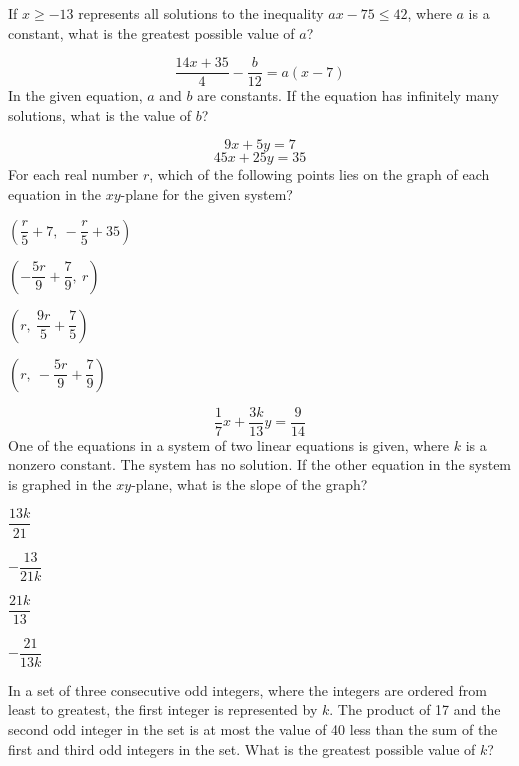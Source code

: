 \vfill
\noindent\begin{minipage}{\linewidth}
\par\smallskip
If $x\ge-13$ represents all solutions to the inequality $ax-75\le42$, where $a$ is a constant, what is the greatest possible value of $a$?
\end{minipage}
\vfill
\noindent\begin{minipage}{\linewidth}
\par\smallskip
$$\frac{14x+35}{4}-\frac{b}{12}=a(x-7)$$ In the given equation, $a$ and $b$ are constants. If the equation has infinitely many solutions, what is the value of $b$?
\end{minipage}
\vfill
\clearpage
\noindent\begin{minipage}{\linewidth}
\par\smallskip
$$9x+5y=7$$ $$45x+25y=35$$ For each real number $r$, which of the following points lies on the graph of each equation in the $xy$-plane for the given system?
\begin{satchoices}
  \item[A)] $\left(\dfrac{r}{5}+7,\ -\dfrac{r}{5}+35\right)$
  \item[B)] $\left(-\dfrac{5r}{9}+\dfrac{7}{9},\ r\right)$
  \item[C)] $\left(r,\ \dfrac{9r}{5}+\dfrac{7}{5}\right)$
  \item[D)] $\left(r,\ -\dfrac{5r}{9}+\dfrac{7}{9}\right)$
\end{satchoices}
\end{minipage}
\vfill
\noindent\begin{minipage}{\linewidth}
\par\smallskip
$$\frac{1}{7}x+\frac{3k}{13}y=\frac{9}{14}$$ One of the equations in a system of two linear equations is given, where $k$ is a nonzero constant. The system has no solution. If the other equation in the system is graphed in the $xy$-plane, what is the slope of the graph?
\begin{satchoices}
  \item[A)] $\dfrac{13k}{21}$
  \item[B)] $-\dfrac{13}{21k}$
  \item[C)] $\dfrac{21k}{13}$
  \item[D)] $-\dfrac{21}{13k}$
\end{satchoices}
\end{minipage}
\vfill
\noindent\begin{minipage}{\linewidth}
\par\smallskip
In a set of three consecutive odd integers, where the integers are ordered from least to greatest, the first integer is represented by $k$. The product of 17 and the second odd integer in the set is at most the value of 40 less than the sum of the first and third odd integers in the set. What is the greatest possible value of $k$?
\end{minipage}
